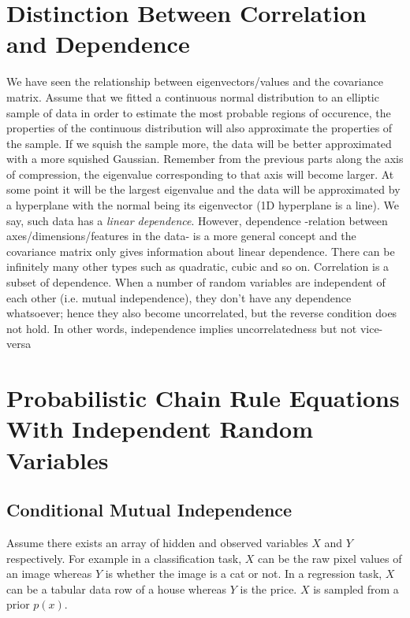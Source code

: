 \documentclass{book}
\numberwithin{equation}{subsection}
\begin{document}
\section{Distinction Between Correlation and Dependence}
\label{cor_dep}
We have seen the relationship between eigenvectors/values and the covariance matrix. Assume that we fitted a continuous normal distribution to an elliptic
sample of data in order to estimate the most probable regions of occurence, the properties of the continuous distribution will also approximate the properties of the sample. If we squish the sample more, the data will be better approximated with a more squished Gaussian. Remember from the previous parts along the axis of compression, the eigenvalue corresponding to that axis will become larger. At some point it will be the largest eigenvalue and the data will be approximated by a hyperplane with the normal being its eigenvector (1D hyperplane is a line). We say, such data has a \textit{linear dependence}. However, dependence -relation between axes/dimensions/features in the data- is a more general concept and the covariance matrix only gives information about linear dependence. There can be infinitely many other types such as quadratic, cubic and so on. Correlation is a subset of dependence. When a number of random variables are independent of each other (i.e. mutual independence), they don't have any dependence whatsoever; hence they also become uncorrelated, but the reverse condition does not hold. In other words, independence implies uncorrelatedness but not vice-versa
\section{Probabilistic Chain Rule Equations With Independent Random Variables}
\subsection{Conditional Mutual Independence}
\label{cond_mutual_independence}
Assume there exists an array of hidden and observed variables $X$ and $Y$ respectively. For example in a classification task, $X$ can be the raw pixel values of an image whereas $Y$ is whether the image is a cat or not. In a regression task, $X$ can be a tabular data row of a house whereas $Y$ is the price. $X$ is sampled from a prior $p(x)$.
\end{document}
